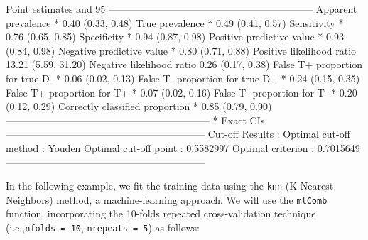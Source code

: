\documentclass[10pt]{article}
\begin{document}
\begin{Schunk}
\begin{Soutput}
Point estimates and 95% CIs:
--------------------------------------------------------------
Apparent prevalence *                  0.40 (0.33, 0.48)
True prevalence *                      0.49 (0.41, 0.57)
Sensitivity *                          0.76 (0.65, 0.85)
Specificity *                          0.94 (0.87, 0.98)
Positive predictive value *            0.93 (0.84, 0.98)
Negative predictive value *            0.80 (0.71, 0.88)
Positive likelihood ratio              13.21 (5.59, 31.20)
Negative likelihood ratio              0.26 (0.17, 0.38)
False T+ proportion for true D- *      0.06 (0.02, 0.13)
False T- proportion for true D+ *      0.24 (0.15, 0.35)
False T+ proportion for T+ *           0.07 (0.02, 0.16)
False T- proportion for T- *           0.20 (0.12, 0.29)
Correctly classified proportion *      0.85 (0.79, 0.90)
--------------------------------------------------------------
* Exact CIs
------------------------------------------------------------ 
Cut-off Results : 
Optimal cut-off method : Youden 
Optimal cut-off point  : 0.5582997 
Optimal criterion      : 0.7015649 
------------------------------------------------------------ 
\end{Soutput}
\end{Schunk}
In the following example, we fit the training data using the \texttt{knn} (K-Nearest Neighbors) method, a machine-learning approach. We will use the \texttt{mlComb} function, incorporating the 10-folds repeated cross-validation technique (i.e.,\texttt{nfolds = 10}, \texttt{nrepeats = 5}) as follows:
\end{document}
